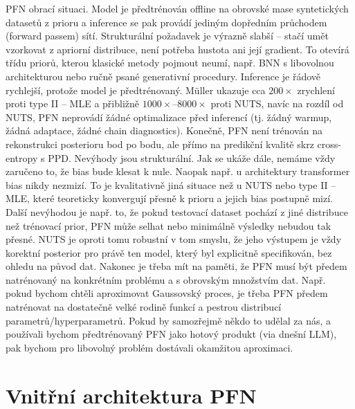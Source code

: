 PFN obrací situaci.
Model je předtrénován offline na obrovské mase syntetických datasetů z prioru a inference se pak provádí jediným dopředním průchodem (forward passem) sítí. 
Strukturální požadavek je výrazně slabší – stačí umět vzorkovat z apriorní distribuce, není potřeba hustota ani její gradient. 
To otevírá třídu priorů, kterou klasické metody pojmout neumí, např. BNN s libovolnou architekturou nebo ručně psané generativní procedury. 
Inference je řádově rychlejší, protože model je předtrénovaný.
Müller ukazuje cca $200\times$ zrychlení proti type II – MLE a přibližně $1 000\times – 8 000\times$ proti NUTS, navíc na rozdíl od NUTS, PFN neprovádí žádné optimalizace před inferencí (tj. žádný warmup, žádná adaptace, žádné chain diagnostics). 
Konečně, PFN není trénován na rekonstrukci posterioru bod po bodu, ale přímo na predikční kvalitě skrz cross-entropy s PPD. 
Nevýhody jsou strukturální. 
Jak se ukáže dále, nemáme vždy zaručeno to, že bias bude klesat k nule. 
Naopak např. u architektury transformer bias nikdy nezmizí.
To je kvalitativně jiná situace než u NUTS nebo type II – MLE, které teoreticky konvergují přesně k prioru a jejich bias postupně mizí. 
Další nevýhodou je např. to, že pokud testovací dataset pochází z jiné distribuce než trénovací prior, PFN může selhat nebo minimálně výsledky nebudou tak přesné. 
NUTS je oproti tomu robustní v tom smyslu, že jeho výstupem je vždy korektní posterior pro právě ten model, který byl explicitně specifikován, bez ohledu na původ dat. 
Nakonec je třeba mít na paměti, že PFN musí být předem natrénovaný na konkrétním problému a s obrovským množstvím dat.
Např. pokud bychom chtěli aproximovat Gaussovský proces, je třeba PFN předem natrénovat na dostatečně velké rodině funkcí a pestrou distribucí parametrů/hyperparametrů.
Pokud by samozřejmě někdo to udělal za nás, a používali bychom předtrénovaný PFN jako hotový produkt (via dnešní LLM), pak bychom pro libovolný problém dostávali okamžitou aproximaci.

\section{Vnitřní architektura PFN}

